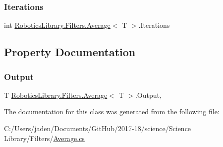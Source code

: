 \mbox{\label{class_robotics_library_1_1_filters_1_1_average_a8ba4cd3fbcc9b94839a9a023c6b95732}} 
\subsubsection{\texorpdfstring{Iterations}{Iterations}}
{\footnotesize\ttfamily int \hyperlink{class_robotics_library_1_1_filters_1_1_average}{Robotics\+Library.\+Filters.\+Average}$<$ T $>$.Iterations\hspace{0.3cm}{\ttfamily [private]}}



\subsection{Property Documentation}
\mbox{\label{class_robotics_library_1_1_filters_1_1_average_aa59efec0916673c66b3507c4360c619e}} 
\subsubsection{\texorpdfstring{Output}{Output}}
{\footnotesize\ttfamily T \hyperlink{class_robotics_library_1_1_filters_1_1_average}{Robotics\+Library.\+Filters.\+Average}$<$ T $>$.Output\hspace{0.3cm}{\ttfamily [get]}, {}}



The documentation for this class was generated from the following file\+:\begin{DoxyCompactItemize}
\item 
C\+:/\+Users/jaden/\+Documents/\+Git\+Hub/2017-\/18/science/\+Science Library/\+Filters/\hyperlink{_average_8cs}{Average.\+cs}\end{DoxyCompactItemize}
